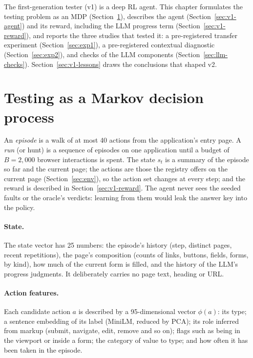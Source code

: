 \label{chap.4}

The first-generation tester (v1) is a deep RL agent. This chapter formulates the testing
problem as an MDP (Section~\ref{sec:v1-mdp}), describes the agent
(Section~\ref{sec:v1-agent}) and its reward, including the LLM progress term
(Section~\ref{sec:v1-reward}), and reports the three studies that tested it: a
pre-registered transfer experiment (Section~\ref{sec:exp1}), a pre-registered contextual
diagnostic (Section~\ref{sec:exp2}), and checks of the LLM components
(Section~\ref{sec:llm-checks}). Section~\ref{sec:v1-lessons} draws the conclusions that
shaped v2.

\section{Testing as a Markov decision process}
\label{sec:v1-mdp}

An \emph{episode} is a walk of at most 40 actions from the application's entry page. A
\emph{run} (or hunt) is a sequence of episodes on one application until a budget of
$B = 2{,}000$ browser interactions is spent. The state $s_t$ is a summary of the episode so
far and the current page; the actions are those the registry offers on the current page
(Section~\ref{sec:env}), so the action set changes at every step; and the reward is
described in Section~\ref{sec:v1-reward}. The agent never sees the seeded faults or the
oracle's verdicts: learning from them would leak the answer key into the policy.

\paragraph{State.} The state vector has 25 numbers: the episode's history (step, distinct
pages, recent repetitions), the page's composition (counts of links, buttons, fields,
forms, by kind), how much of the current form is filled, and the history of the LLM's
progress judgments. It deliberately carries no page text, heading or URL.

\paragraph{Action features.} Each candidate action $a$ is described by a 95-dimensional
vector $\phi(a)$: its type; a sentence embedding of its label (MiniLM, reduced by PCA); its
role inferred from markup (submit, navigate, edit, remove and so on); flags such as being in
the viewport or inside a form; the category of value to type; and how often it has been
taken in the episode.

